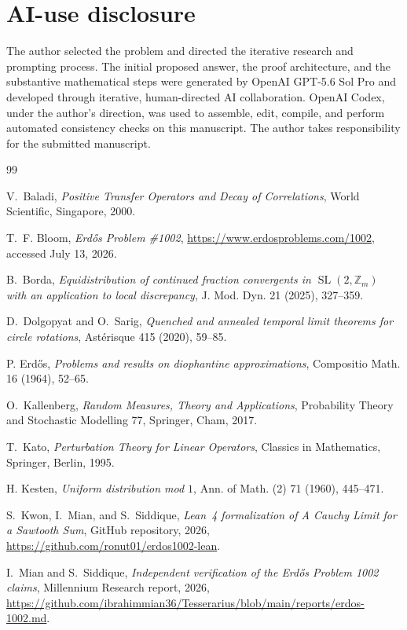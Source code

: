 \documentclass[11pt,a4paper]{amsart}
\theoremstyle{definition}
\theoremstyle{remark}
\begin{document}
\section*{AI-use disclosure}

The author selected the problem and directed the iterative research and
prompting process.  The initial proposed answer, the proof architecture, and
the substantive mathematical steps were generated by OpenAI GPT-5.6 Sol Pro
and developed through iterative, human-directed AI collaboration.  OpenAI
Codex, under the author's direction, was used to assemble, edit, compile, and
perform automated consistency checks on this manuscript.  The author takes
responsibility for the submitted manuscript.

\begin{thebibliography}{99}

V.~Baladi,
\emph{Positive Transfer Operators and Decay of Correlations},
World Scientific, Singapore, 2000.

T.~F. Bloom,
\emph{Erd\H{o}s Problem \#1002},
\url{https://www.erdosproblems.com/1002}, accessed July 13, 2026.

B.~Borda,
\emph{Equidistribution of continued fraction convergents in
$\operatorname{SL}(2,\mathbb Z_m)$ with an application to local discrepancy},
J. Mod. Dyn. 21 (2025), 327--359.

D.~Dolgopyat and O.~Sarig,
\emph{Quenched and annealed temporal limit theorems for circle rotations},
Ast\'erisque 415 (2020), 59--85.

P. Erd\H{o}s,
\emph{Problems and results on diophantine approximations},
Compositio Math. 16 (1964), 52--65.

O.~Kallenberg,
\emph{Random Measures, Theory and Applications},
Probability Theory and Stochastic Modelling 77,
Springer, Cham, 2017.

T.~Kato,
\emph{Perturbation Theory for Linear Operators},
Classics in Mathematics, Springer, Berlin, 1995.

H. Kesten,
\emph{Uniform distribution mod $1$},
Ann. of Math. (2) 71 (1960), 445--471.

S.~Kwon, I.~Mian, and S.~Siddique,
\emph{Lean~4 formalization of A Cauchy Limit for a Sawtooth Sum},
GitHub repository, 2026,
\url{https://github.com/ronut01/erdos1002-lean}.

I.~Mian and S.~Siddique,
\emph{Independent verification of the Erd\H{o}s Problem 1002 claims},
Millennium Research report, 2026,
\url{https://github.com/ibrahimmian36/Tesserarius/blob/main/reports/erdos-1002.md}.


\end{thebibliography}
\end{document}
